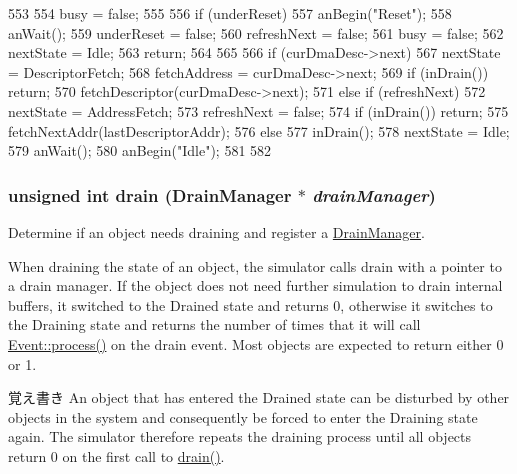 \begin{DoxyCode}
553 {
554     busy = false;
555 
556     if (underReset) {
557         anBegin("Reset");
558         anWait();
559         underReset = false;
560         refreshNext = false;
561         busy = false;
562         nextState = Idle;
563         return;
564     }
565 
566     if (curDmaDesc->next) {
567         nextState = DescriptorFetch;
568         fetchAddress = curDmaDesc->next;
569         if (inDrain()) return;
570         fetchDescriptor(curDmaDesc->next);
571     } else if (refreshNext) {
572         nextState = AddressFetch;
573         refreshNext = false;
574         if (inDrain()) return;
575         fetchNextAddr(lastDescriptorAddr);
576     } else {
577         inDrain();
578         nextState = Idle;
579         anWait();
580         anBegin("Idle");
581     }
582 }
\end{DoxyCode}
\hypertarget{classCopyEngine_1_1CopyEngineChannel_a6bf479c521c7c3eb473822d953275b26}{
\subsubsection[{drain}]{\setlength{\rightskip}{0pt plus 5cm}unsigned int drain ({\bf DrainManager} $\ast$ {\em drainManager})}}
\label{classCopyEngine_1_1CopyEngineChannel_a6bf479c521c7c3eb473822d953275b26}
Determine if an object needs draining and register a \hyperlink{classDrainManager}{DrainManager}.

When draining the state of an object, the simulator calls drain with a pointer to a drain manager. If the object does not need further simulation to drain internal buffers, it switched to the Drained state and returns 0, otherwise it switches to the Draining state and returns the number of times that it will call \hyperlink{classEvent_a142b75b68a6291400e20fb0dd905b1c8}{Event::process()} on the drain event. Most objects are expected to return either 0 or 1.

\begin{DoxyNote}{覚え書き}
An object that has entered the Drained state can be disturbed by other objects in the system and consequently be forced to enter the Draining state again. The simulator therefore repeats the draining process until all objects return 0 on the first call to \hyperlink{classCopyEngine_1_1CopyEngineChannel_a6bf479c521c7c3eb473822d953275b26}{drain()}.
\end{DoxyNote}

